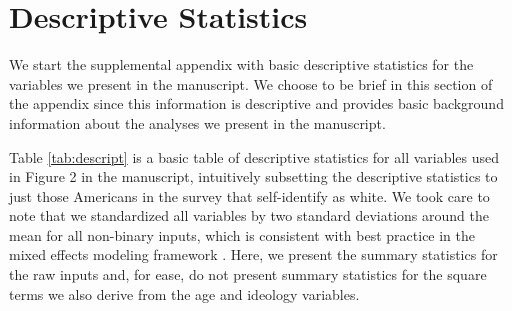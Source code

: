 \documentclass[11pt,]{article}
\begin{document}
\hypertarget{descriptive-statistics}{%
\section{Descriptive Statistics}\label{descriptive-statistics}}

We start the supplemental appendix with basic descriptive statistics for
the variables we present in the manuscript. We choose to be brief in
this section of the appendix since this information is descriptive and
provides basic background information about the analyses we present in
the manuscript.

Table \ref{tab:descript} is a basic table of descriptive statistics for
all variables used in Figure 2 in the manuscript, intuitively subsetting
the descriptive statistics to just those Americans in the survey that
self-identify as white. We took care to note that we standardized all
variables by two standard deviations around the mean for all non-binary
inputs, which is consistent with best practice in the mixed effects
modeling framework \citep[c.f.][]{gelman2008sri}. Here, we present the
summary statistics for the raw inputs and, for ease, do not present
summary statistics for the square terms we also derive from the age and
ideology variables.
\end{document}
